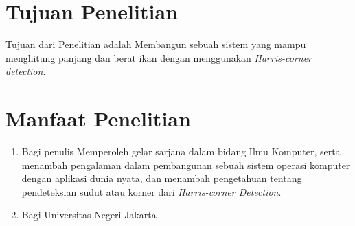 \section{Tujuan Penelitian}
	Tujuan dari Penelitian adalah Membangun sebuah sistem yang mampu menghitung panjang dan berat ikan dengan menggunakan \emph{Harris-corner detection}. 

\section{Manfaat Penelitian}
\begin{enumerate}
	\item Bagi penulis
	 Memperoleh gelar sarjana dalam bidang Ilmu Komputer, serta menambah pengalaman dalam pembangunan sebuah sistem operasi komputer dengan aplikasi dunia nyata, dan menambah pengetahuan tentang pendeteksian sudut atau korner dari \emph{Harris-corner Detection}. 

		
	\item Bagi Universitas Negeri Jakarta
	
	
			
\end{enumerate}

\begin{comment}

\end{comment}
